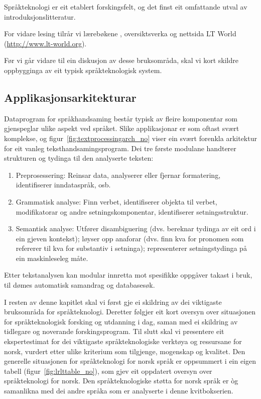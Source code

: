 \begin{multicols}{2}
Språkteknologi er eit etablert forskingsfelt, og det finst eit omfattande utval av introduksjonslitteratur.

For vidare lesing tilrår vi lærebøkene \cite{jurafsky-martin01, manning-schuetze1}, oversiktsverka \cite{lt-survey1} og nettsida LT World (\url{http://www.lt-world.org}).

Før vi går vidare til ein diskusjon av desse bruksområda, skal vi kort skildre oppbygginga av eit typisk språkteknologisk system. 

\subsection{Applikasjonsarkitekturar}

Dataprogram for språkhandsaming består typisk av fleire komponentar som gjenspeglar ulike aspekt ved språket. Slike applikasjonar er som oftast svært komplekse, og figur~\ref{fig:textprocessingarch_no} viser ein svært forenkla arkitektur for eit vanleg teksthandsamingsprogram. Dei tre første modulane handterer strukturen og tydinga til den analyserte teksten:

\begin{enumerate}
\item Preprosessering: Reinsar data, analyserer eller fjernar formatering, identifiserer inndataspråk, osb. 
\item Grammatisk analyse: Finn verbet, identifiserer objekta til verbet, modifikatorar og andre setningskomponentar, identifiserer setningsstruktur. 
\item Semantisk analyse: Utfører disambiguering (dvs. bereknar tydinga av eit ord i ein gjeven kontekst); løyser opp anaforar (dvs. finn kva for pronomen som refererer til kva for substantiv i setninga); representerer setningstydinga på ein maskinleseleg måte.
\end{enumerate}

Etter tekstanalysen kan modular innretta mot spesifikke oppgåver takast i bruk, til dømes automatisk samandrag og databasesøk. 

I resten av denne kapitlet skal vi først gje ei skildring av dei viktigaste bruksområda for språkteknologi. Deretter følgjer eit kort oversyn over situasjonen for språkteknologisk forsking og utdanning i dag, saman med ei skildring av tidlegare og noverande forskingsprogram. Til slutt skal vi presentere eit ekspertestimat for dei viktigaste språkteknologiske verktøya og ressursane for norsk, vurdert etter ulike kriterium som tilgjenge, mogenskap og kvalitet. Den generelle situasjonen for språkteknologi for norsk språk er oppsummert i ein eigen tabell (figur~\ref{fig:lrlttable_no}), som gjev eit oppdatert oversyn over språkteknologi for norsk. Den språkteknologiske støtta for norsk språk er òg samanlikna med dei andre språka som er analyserte i denne kvitbokserien. 


\end{multicols}
